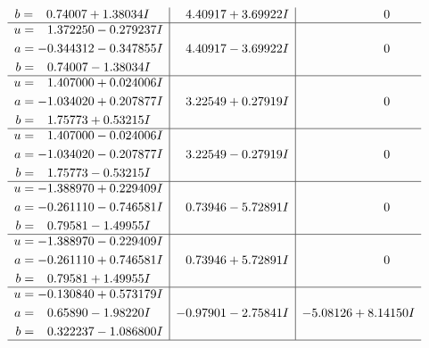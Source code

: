 \documentclass[1p]{elsarticle_modified}
\theoremstyle{definition}
\begin{document}
$$\begin{array}{c|c|c}
\begin{aligned}
b &= \phantom{-}0.74007 + 1.38034 I\end{aligned}
 & \phantom{-}4.40917 + 3.69922 I & \phantom{-0.000000 } 0 \\ \hline\begin{aligned}
u &= \phantom{-}1.372250 - 0.279237 I \\
a &= -0.344312 - 0.347855 I \\
b &= \phantom{-}0.74007 - 1.38034 I\end{aligned}
 & \phantom{-}4.40917 - 3.69922 I & \phantom{-0.000000 } 0 \\ \hline\begin{aligned}
u &= \phantom{-}1.407000 + 0.024006 I \\
a &= -1.034020 + 0.207877 I \\
b &= \phantom{-}1.75773 + 0.53215 I\end{aligned}
 & \phantom{-}3.22549 + 0.27919 I & \phantom{-0.000000 } 0 \\ \hline\begin{aligned}
u &= \phantom{-}1.407000 - 0.024006 I \\
a &= -1.034020 - 0.207877 I \\
b &= \phantom{-}1.75773 - 0.53215 I\end{aligned}
 & \phantom{-}3.22549 - 0.27919 I & \phantom{-0.000000 } 0 \\ \hline\begin{aligned}
u &= -1.388970 + 0.229409 I \\
a &= -0.261110 - 0.746581 I \\
b &= \phantom{-}0.79581 - 1.49955 I\end{aligned}
 & \phantom{-}0.73946 - 5.72891 I & \phantom{-0.000000 } 0 \\ \hline\begin{aligned}
u &= -1.388970 - 0.229409 I \\
a &= -0.261110 + 0.746581 I \\
b &= \phantom{-}0.79581 + 1.49955 I\end{aligned}
 & \phantom{-}0.73946 + 5.72891 I & \phantom{-0.000000 } 0 \\ \hline\begin{aligned}
u &= -0.130840 + 0.573179 I \\
a &= \phantom{-}0.65890 - 1.98220 I \\
b &= \phantom{-}0.322237 - 1.086800 I\end{aligned}
 & -0.97901 - 2.75841 I & -5.08126 + 8.14150 I\\
 \hline 
 \end{array}$$\newpage$$\begin{array}{c|c|c}  

\end{array}$$
\end{document}
